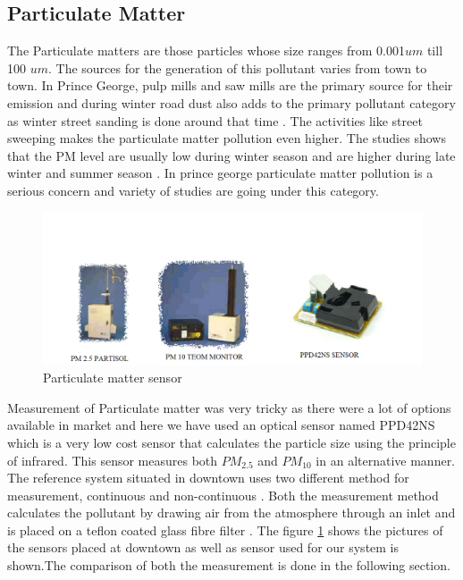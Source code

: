 \subsection{Particulate Matter}

The Particulate matters are those particles whose size ranges from 0.001$um$ till 100 $um$. The sources for the generation of this pollutant varies from town to town. In Prince George, pulp mills and saw mills are the primary source for their emission and during winter road dust also adds to the primary pollutant category as winter street sanding is done around that time \cite{Champagne1996}. The activities like street sweeping makes the particulate matter pollution even higher. The studies shows that the PM level are usually low during winter season and are higher during late winter and summer season \cite{EnvironmentalQualitySectionMoE2012}. In prince george particulate matter pollution is a serious concern and variety of studies are going under this category.

\begin{figure}[h]
  \begin{center}
  \includegraphics[scale=0.70]{images/figure29.png}
  \end{center}
  \caption{Particulate matter sensor}
\label{PM}
\end{figure}
\bigskip

 Measurement of Particulate matter was very tricky as there were a lot of options available in market and here we have used an optical sensor named PPD42NS which is a very low cost sensor that calculates the particle size using the principle of infrared. This sensor measures both $PM_{2.5}$ and $PM_{10}$ in an alternative manner. The reference system situated in downtown uses two different method for measurement, continuous and non-continuous \cite{EnvironmentalQualitySectionMoE2012}. Both the measurement method calculates the pollutant by drawing air from the atmosphere through an inlet and is placed on a teflon coated glass fibre filter  \cite{Environment2010}. The figure \ref{PM} shows the pictures of the sensors placed at downtown as well as sensor used for our system is shown.The comparison of both the measurement is done in the following section.

